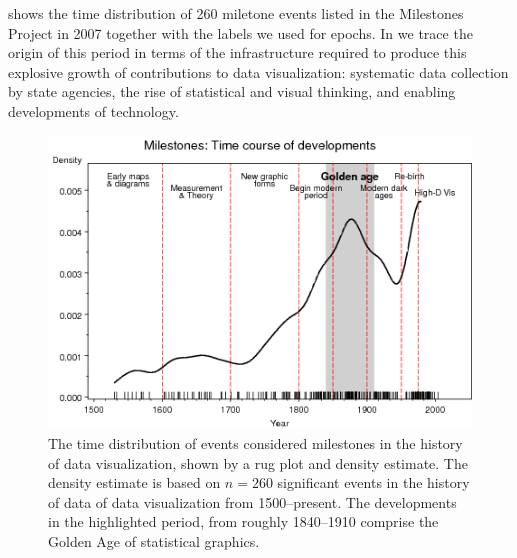  shows the time distribution of 260 miletone events
listed in the Milestones Project in 2007 together with the labels we used for
epochs.
In \citet{Friendly:2008:golden} we trace the origin of this period in terms
of the infrastructure required to produce this explosive growth of contributions
to data visualization: systematic data collection by state agencies,
the rise of statistical and visual thinking, and enabling  developments of
technology.
\begin{figure}[!htb]
  \centering
  \includegraphics[width=.9\textwidth,clip]{fig/mileyears4}
  \caption{The time distribution of events considered milestones in the history of
  data visualization, shown by a rug plot and
  density estimate.
  The density estimate is based on $n=260$ significant events in the history of data
  of data visualization from 1500--present.
  The developments in the highlighted period, from roughly 1840--1910 comprise the
  Golden Age of statistical graphics.
  }
  \label{fig:mileyears4}
\end{figure}


